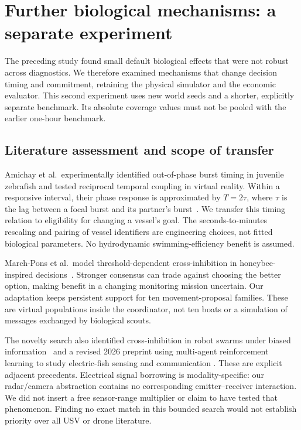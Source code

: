 \section{Further biological mechanisms: a separate experiment}
\label{sec:v4}
The preceding study found small default biological effects that were not robust
across diagnostics. We therefore examined mechanisms that change decision timing
and commitment, retaining the physical simulator and the economic evaluator.
This second experiment uses new world seeds and a shorter, explicitly separate
benchmark. Its absolute coverage values must not be pooled with the earlier
one-hour benchmark.

\subsection{Literature assessment and scope of transfer}
Amichay et al.\ experimentally identified out-of-phase burst timing in juvenile
zebrafish and tested reciprocal temporal coupling in virtual reality. Within a
responsive interval, their phase response is approximated by $T=2\tau$, where
$\tau$ is the lag between a focal burst and its partner's burst~\cite{amichay2024}.
We transfer this timing relation to eligibility for changing a vessel's goal.
The seconds-to-minutes rescaling and pairing of vessel identifiers are engineering
choices, not fitted biological parameters. No hydrodynamic swimming-efficiency
benefit is assumed.

March-Pons et al.\ model threshold-dependent cross-inhibition in honeybee-inspired
decisions~\cite{marchpons2025}. Stronger consensus can trade against choosing the
better option, making benefit in a changing monitoring mission uncertain.
Our adaptation keeps persistent support for ten movement-proposal families.
These are virtual populations inside the coordinator, not ten boats or a
simulation of messages exchanged by biological scouts.

The novelty search also identified cross-inhibition in robot swarms under
biased information~\cite{zakir2026} and a revised 2026 preprint using multi-agent
reinforcement learning to study electric-fish sensing and communication
\cite{singh2026}. These are explicit adjacent precedents. Electrical signal
borrowing is modality-specific: our radar/camera abstraction contains no
corresponding emitter--receiver interaction. We did not insert a free sensor-range
multiplier or claim to have tested that phenomenon. Finding no exact match in this
bounded search would not establish priority over all USV or drone literature.

